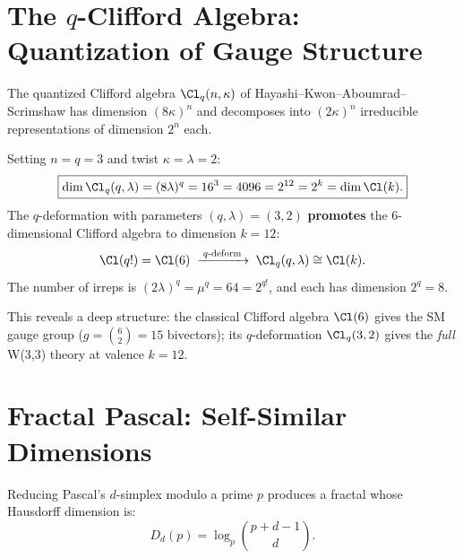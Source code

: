 \section{The $q$-Clifford Algebra: Quantization of Gauge Structure}
\label{sec:qclifford}

The quantized Clifford algebra $\Cl_q(n,\kappa)$ of Hayashi--Kwon--Aboumrad--Scrimshaw
has dimension $(8\kappa)^n$ and decomposes into $(2\kappa)^n$ irreducible
representations of dimension $2^n$ each.

\begin{theorem}
\label{thm:qcliff-promotion}
Setting $n=q=3$ and twist $\kappa=\lambda=2$:
\begin{equation}
\boxed{
\dim\Cl_q(q,\lambda) = (8\lambda)^q = 16^3 = 4096 = 2^{12} = 2^k = \dim\Cl(k).
}
\end{equation}
The $q$-deformation with parameters $(q,\lambda)=(3,2)$
\textbf{promotes} the 6-dimensional Clifford algebra to dimension $k=12$:
\begin{equation}
\Cl(q!) = \Cl(6) \;\xrightarrow{\;\text{$q$-deform}\;}\; \Cl_q(q,\lambda) \cong \Cl(k).
\end{equation}
The number of irreps is $(2\lambda)^q = \mu^q = 64 = 2^{q!}$,
and each has dimension $2^q = 8$.
\end{theorem}

This reveals a deep structure: the classical Clifford algebra $\Cl(6)$
gives the SM gauge group ($g = \binom{6}{2} = 15$ bivectors);
its $q$-deformation $\Cl_q(3,2)$ gives the \emph{full} W(3,3) theory
at valence $k=12$.


\section{Fractal Pascal: Self-Similar Dimensions}
\label{sec:fractal-pascal}

Reducing Pascal's $d$-simplex modulo a prime $p$ produces a fractal
whose Hausdorff dimension is:
\begin{equation}
D_d(p) = \log_p\binom{p+d-1}{d}.
\end{equation}

